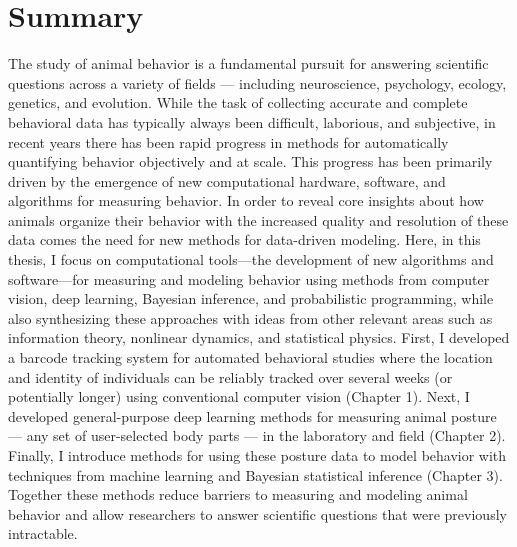 	\chapter*{Summary}
  The study of animal behavior is a fundamental pursuit for answering scientific questions across a variety of fields --- including neuroscience, psychology, ecology, genetics, and evolution. While the task of collecting accurate and complete behavioral data has typically always been difficult, laborious, and subjective, in recent years there has been rapid progress in methods for automatically quantifying behavior objectively and at scale. This progress has been primarily driven by the emergence of new computational hardware, software, and algorithms for measuring behavior. In order to reveal core insights about how animals organize their behavior with the increased quality and resolution of these data comes the need for new methods for data-driven modeling. Here, in this thesis, I focus on computational tools—the development of new algorithms and software—for measuring and modeling behavior using methods from computer vision, deep learning, Bayesian inference, and probabilistic programming, while also synthesizing these approaches with ideas from other relevant areas such as information theory, nonlinear dynamics, and statistical physics. First, I developed a barcode tracking system for automated behavioral studies where the location and identity of individuals can be reliably tracked over several weeks (or potentially longer) using conventional computer vision (Chapter 1). Next, I developed general-purpose deep learning methods for measuring animal posture --- any set of user-selected body parts --- in the laboratory and field (Chapter 2). Finally, I introduce methods for using these posture data to model behavior with techniques from machine learning and Bayesian statistical inference (Chapter 3). Together these methods reduce barriers to measuring and modeling animal behavior and allow researchers to answer scientific questions that were previously intractable.

